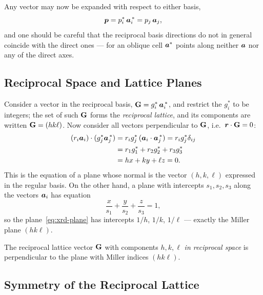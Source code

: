 Any vector may now be expanded with respect to either basis,
\begin{equation}
    \bm{p} = p^{*}_i\,\bm{a}^{\,*}_i = p_j\,\bm{a}_j,
\end{equation}
and one should be careful that the reciprocal basis directions do not in general coincide with the direct ones --- for an oblique cell $\bm{a}^{*}$ points along neither $\bm{a}$ nor any of the direct axes.

\subsection{Reciprocal Space and Lattice Planes}

Consider a vector in the reciprocal basis, $\cvect{G} = g^{*}_i\,\lvect{a}^{\,*}_i$, and restrict the $g^{*}_i$ to be integers; the set of such $\cvect{G}$ forms the \emph{reciprocal lattice}, and its components are written $\cvect{G} = (hk\ell)$. Now consider all vectors perpendicular to $\cvect{G}$, i.e.\ $\lvect{r}\cdot\cvect{G} = 0$:
\begin{align}
    (r_i\bm{a}_i)\cdot(g^{*}_j\bm{a}^{\,*}_j) &= r_i g^{*}_j\,(\bm{a}_i\cdot\bm{a}^{\,*}_j) = r_i g^{*}_j \delta_{ij} \\
    &= r_1 g^{*}_1 + r_2 g^{*}_2 + r_3 g^{*}_3 \\
    &= hx + ky + \ell z = 0. \label{eq:xrd-plane}
\end{align}
This is the equation of a plane whose normal is the vector $(h,k,\ell)$ expressed in the regular basis. On the other hand, a plane with intercepts $s_1, s_2, s_3$ along the vectors $\bm{a}_i$ has equation
\begin{equation}
    \frac{x}{s_1} + \frac{y}{s_2} + \frac{z}{s_3} = 1,
\end{equation}
so the plane~\eqref{eq:xrd-plane} has intercepts $1/h$, $1/k$, $1/\ell$ --- exactly the Miller plane $(hk\ell)$.

\begin{fact}
The reciprocal lattice vector $\cvect{G}$ with components $h,k,\ell$ \emph{in reciprocal space} is perpendicular to the plane with Miller indices $(hk\ell)$.
\end{fact}


\subsection{Symmetry of the Reciprocal Lattice}

